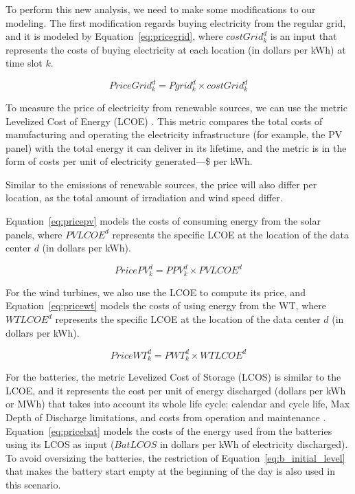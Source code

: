 To perform this new analysis, we need to make some modifications to our modeling. The first modification regards buying electricity from the regular grid, and it is modeled by Equation~\eqref{eq:pricegrid}, where $costGrid^d_k$ is an input that represents the costs of buying electricity at each location (in dollars per kWh) at time slot $k$.

\begin{equation} \label{eq:pricegrid}
 PriceGrid^d_k = Pgrid^d_k \times costGrid^d_k
\end{equation}

To measure the price of electricity from renewable sources, we can use the metric Levelized Cost of Energy (LCOE) \cite{nrel_economic_wt_1995}. This metric compares the total costs of manufacturing and operating the electricity infrastructure (for example, the PV panel) with the total energy it can deliver in its lifetime, and the metric is in the form of costs per unit of electricity generated---\$ per kWh.

Similar to the  emissions of renewable sources, the price will also differ per location, as the total amount of irradiation and wind speed differ.

Equation~\eqref{eq:pricepv} models the costs of consuming energy from the solar panels, where $PVLCOE^d$ represents the specific LCOE at the location of the data center $d$ (in dollars per kWh).

\begin{equation} \label{eq:pricepv}
  PricePV^d_k = PPV^d_k \times PVLCOE^d
\end{equation}


For the wind turbines, we also use the LCOE to compute its price, and Equation~\eqref{eq:pricewt} models the costs of using energy from the WT, where $WTLCOE^d$ represents the specific LCOE at the location of the data center $d$ (in dollars per kWh).

\begin{equation} \label{eq:pricewt}
  PriceWT^d_k = PWT^d_k \times WTLCOE^d
\end{equation}

For the batteries, the metric Levelized Cost of Storage (LCOS) is similar to the LCOE, and it represents the cost per unit of energy discharged (dollars per kWh or MWh) that takes into account its whole life cycle: calendar and cycle life, Max Depth of Discharge limitations, and costs from operation and maintenance \cite{battery_lcos_2022}.  Equation~\eqref{eq:pricebat} models the costs of the energy used from the batteries using its LCOS as input ($BatLCOS$ in dollars per kWh of electricity discharged). To avoid oversizing the batteries, the restriction of Equation~\eqref{eq:b_initial_level} that makes the battery start empty at the beginning of the day is also used in this scenario.

